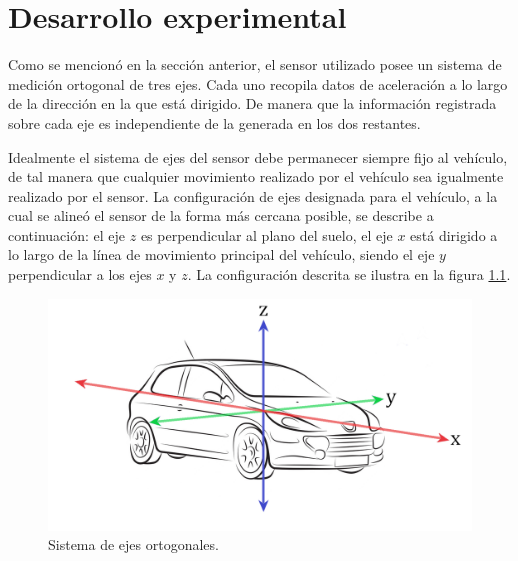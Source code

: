 \chapter{Desarrollo experimental}



Como se mencionó en la sección anterior, el sensor utilizado posee un sistema de medición ortogonal de tres ejes.
Cada uno recopila datos de aceleración a lo largo de la dirección en la que está dirigido. 
De manera que la información registrada sobre cada eje es independiente de la generada en los dos restantes.

Idealmente el sistema de ejes del sensor debe permanecer siempre fijo al vehículo, de tal manera que cualquier movimiento realizado por el vehículo sea igualmente realizado por el sensor. 
La configuración de ejes designada para el vehículo, a la cual se alineó el sensor de la forma más cercana posible, se describe a continuación: el eje $z$ es perpendicular al plano del suelo, el eje $x$ está dirigido a lo largo de la línea de movimiento principal del vehículo, siendo el eje $y$ perpendicular a los ejes $x$ y $z$. 
La configuración descrita se ilustra en la figura \ref{ejes}.

\begin{figure}[H]
\centering
\includegraphics[scale=0.30]{car9.png}
\caption[Caption for LOF]{Sistema de ejes ortogonales\footnotemark[1].}
\label{ejes}
\end{figure}

